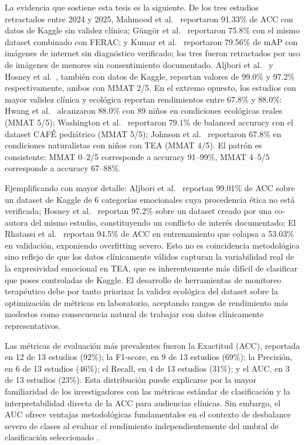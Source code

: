 \documentclass[ASNA,twocolumn]{USG}
\begin{document}
	La evidencia que sostiene esta tesis es la siguiente. De los tres estudios
	retractados entre 2024 y 2025, Mahmood et al.\ \cite{Mahmood2025} reportaron
	91.33\% de ACC con datos de Kaggle sin validez clínica; Güngör et al.\
	\cite{Gungor2025} reportaron 75.8\% con el mismo dataset combinado con FERAC; y
	Kumar et al.\ \cite{Kumar2024} reportaron 79.56\% de mAP con imágenes de internet
	sin diagnóstico verificado; los tres fueron retractados por uso de imágenes de
	menores sin consentimiento documentado. Aljbori et al.\ \cite{Aljbori2025} y
	Hosney et al.\ \cite{Hosney2024}, también con datos de Kaggle, reportan valores de
	99.0\% y 97.2\% respectivamente, ambos con MMAT 2/5. En el extremo opuesto, los
	estudios con mayor validez clínica y ecológica reportan rendimientos entre 67.8\%
	y 88.0\%: Hwang et al.\ \cite{Hwang2024} alcanzaron 88.0\% con 89 niños en
	condiciones ecológicas reales (MMAT 5/5); Washington et al.\ \cite{Washington2022}
	reportaron 79.1\% de balanced accuracy con el dataset CAFÉ pediátrico (MMAT 5/5);
	Johnson et al.\ \cite{Johnson2025} reportaron 67.8\% en condiciones naturalistas
	con niños con TEA (MMAT 4/5). El patrón es consistente: MMAT 0--2/5 corresponde a
	accuracy 91--99\%, MMAT 4--5/5 corresponde a accuracy 67--88\%.
	
	Ejemplificando con mayor detalle: Aljbori et al.\ \cite{Aljbori2025} reportan
	99.01\% de ACC sobre un dataset de Kaggle de 6 categorías emocionales cuya
	procedencia ética no está verificada; Hosney et al.\ \cite{Hosney2024} reportan
	97.2\% sobre un dataset creado por una co-autora del mismo estudio, constituyendo
	un conflicto de interés documentado; El Rhatassi et al.\ \cite{Rhatassi2025}
	reportan 94.5\% de ACC en entrenamiento que colapsa a 53.03\% en validación,
	exponiendo overfitting severo. Esto no es coincidencia metodológica sino reflejo
	de que los datos clínicamente válidos capturan la variabilidad real de la
	expresividad emocional en TEA, que es inherentemente más difícil de clasificar que
	poses controladas de Kaggle. El desarrollo de herramientas de monitoreo terapéutico
	debe por tanto priorizar la validez ecológica del dataset sobre la optimización de
	métricas en laboratorio, aceptando rangos de rendimiento más modestos como
	consecuencia natural de trabajar con datos clínicamente representativos.
	
	Las métricas de evaluación más prevalentes fueron la Exactitud (ACC), reportada en
	12 de 13 estudios (92\%); la F1-score, en 9 de 13 estudios (69\%); la Precisión,
	en 6 de 13 estudios (46\%); el Recall, en 4 de 13 estudios (31\%); y el AUC, en 3
	de 13 estudios (23\%). Esta distribución puede explicarse por la mayor familiaridad
	de los investigadores con las métricas estándar de clasificación y la
	interpretabilidad directa de la ACC para audiencias clínicas. Sin embargo, el AUC
	ofrece ventajas metodológicas fundamentales en el contexto de desbalance severo de
	clases al evaluar el rendimiento independientemente del umbral de clasificación
	seleccionado \cite{Radocaj2025,Hosney2024}.
	
\end{document}
